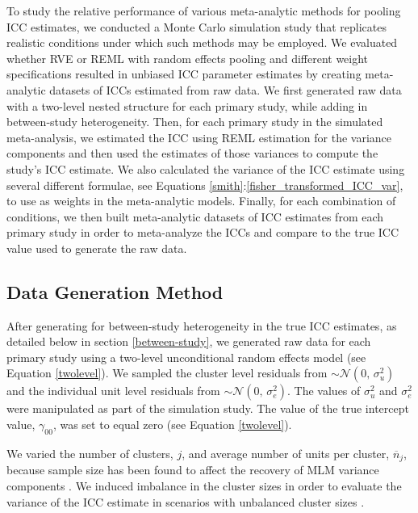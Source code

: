 





To study the relative performance of various meta-analytic methods for pooling ICC estimates, we conducted a Monte Carlo simulation study that replicates realistic conditions under which such methods may be employed. We evaluated whether RVE \cite{hedges2010} or REML \cite{viechtbauer2015} with random effects pooling and different weight specifications resulted in unbiased ICC parameter estimates by creating meta-analytic datasets of ICCs estimated from raw data. We first generated raw data with a two-level nested structure for each primary study, while adding in between-study heterogeneity. Then, for each primary study in the simulated meta-analysis, we estimated the ICC using REML estimation for the variance components and then used the estimates of those variances to compute the study's ICC estimate. We also calculated the variance of the ICC estimate using several different formulae, see Equations \ref{smith}:\ref{fisher_transformed_ICC_var}, to use as weights in the meta-analytic models. Finally, for each combination of conditions, we then built meta-analytic datasets of ICC estimates from each primary study in order to meta-analyze the ICCs and compare to the true ICC value used to generate the raw data.  

\subsection{Data Generation Method}

After generating for between-study heterogeneity in the true ICC estimates, as detailed below in section \ref{between-study}, we generated raw data for each primary study using a two-level unconditional random effects model (see Equation \ref{twolevel}). We sampled the cluster level residuals from $\sim \mathcal{N}(0,\,\sigma_u^{2})$ and the individual unit level residuals from $\sim \mathcal{N}(0,\,\sigma_e^{2})$. The values of $\sigma^2_u$ and $\sigma_e^2$ were manipulated as part of the simulation study. The value of the true intercept value, $\gamma_{00}$, was set to equal zero (see Equation \ref{twolevel}). 

We varied the number of clusters, $j$, and average number of units per cluster, $\overline{n}_j$, because sample size has been found to affect the recovery of MLM variance components \cite{chang2015, mok1995sample}. We induced imbalance in the cluster sizes in order to evaluate the variance of the ICC estimate in scenarios with unbalanced cluster sizes \cite{donner1980a}. 


